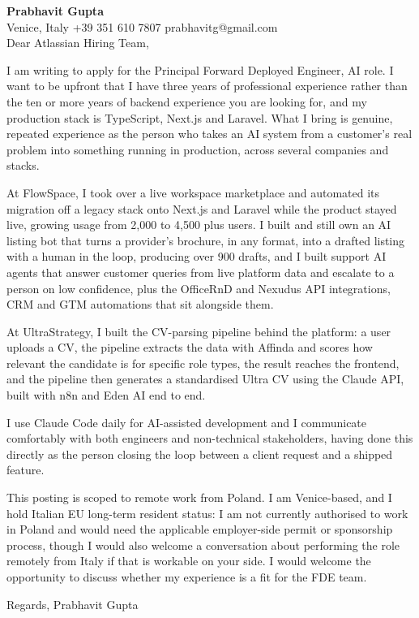 \documentclass[a4paper,10.5pt]{article}
\begin{document}
\textbf{Prabhavit Gupta}\\
Venice, Italy \textbar{} +39 351 610 7807 \textbar{} prabhavitg@gmail.com\\[10pt]
Dear Atlassian Hiring Team,

I am writing to apply for the Principal Forward Deployed Engineer, AI role. I want to be upfront that I have three years of professional experience rather than the ten or more years of backend experience you are looking for, and my production stack is TypeScript, Next.js and Laravel. What I bring is genuine, repeated experience as the person who takes an AI system from a customer's real problem into something running in production, across several companies and stacks.

At FlowSpace, I took over a live workspace marketplace and automated its migration off a legacy stack onto Next.js and Laravel while the product stayed live, growing usage from 2,000 to 4,500 plus users. I built and still own an AI listing bot that turns a provider's brochure, in any format, into a drafted listing with a human in the loop, producing over 900 drafts, and I built support AI agents that answer customer queries from live platform data and escalate to a person on low confidence, plus the OfficeRnD and Nexudus API integrations, CRM and GTM automations that sit alongside them.

At UltraStrategy, I built the CV-parsing pipeline behind the platform: a user uploads a CV, the pipeline extracts the data with Affinda and scores how relevant the candidate is for specific role types, the result reaches the frontend, and the pipeline then generates a standardised Ultra CV using the Claude API, built with n8n and Eden AI end to end.

I use Claude Code daily for AI-assisted development and I communicate comfortably with both engineers and non-technical stakeholders, having done this directly as the person closing the loop between a client request and a shipped feature.

This posting is scoped to remote work from Poland. I am Venice-based, and I hold Italian EU long-term resident status: I am not currently authorised to work in Poland and would need the applicable employer-side permit or sponsorship process, though I would also welcome a conversation about performing the role remotely from Italy if that is workable on your side. I would welcome the opportunity to discuss whether my experience is a fit for the FDE team.

Regards, Prabhavit Gupta
\end{document}
